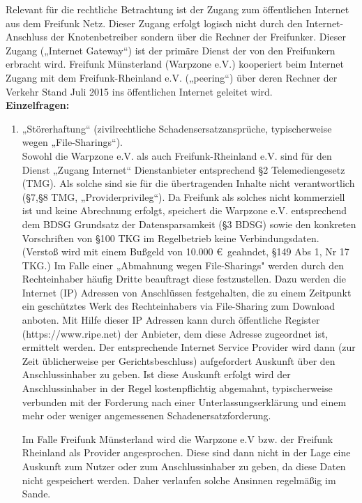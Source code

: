 \documentclass{article}
\begin{document}
Relevant für die rechtliche Betrachtung ist der Zugang zum öffentlichen Internet aus dem Freifunk Netz. Dieser Zugang erfolgt logisch nicht durch den Internet-Anschluss der Knotenbetreiber sondern über die Rechner der Freifunker. Dieser Zugang („Internet Gateway“) ist der primäre Dienst der von den Freifunkern erbracht wird. Freifunk  Münsterland (Warpzone e.V.) kooperiert beim Internet Zugang mit dem Freifunk-Rheinland e.V. („peering“)  über deren Rechner der Verkehr Stand Juli 2015 ins öffentlichen Internet geleitet wird.\bigskip\\

\textbf{Einzelfragen:}

\begin{enumerate}\item  „Störerhaftung“ (zivilrechtliche Schadensersatzansprüche, typischerweise wegen „File-Sharings“).\\
Sowohl die Warpzone e.V. als auch Freifunk-Rheinland e.V. sind für den Dienst „Zugang Internet“ Dienstanbieter entsprechend §2 Telemediengesetz (TMG).  Als solche sind sie für die übertragenden Inhalte nicht verantwortlich (§7,§8 TMG, „Providerprivileg“). Da Freifunk als solches nicht kommerziell ist und keine Abrechnung erfolgt, speichert die Warpzone e.V. entsprechend dem BDSG Grundsatz der Datensparsamkeit (§3 BDSG) sowie den konkreten Vorschriften von §100 TKG im Regelbetrieb keine Verbindungsdaten. (Verstoß wird mit einem Bußgeld von 10.000 \euro\ geahndet, §149 Abs 1, Nr 17 TKG.) Im Falle einer „Abmahnung wegen File-Sharings" werden durch den Rechteinhaber  häufig Dritte beauftragt diese festzustellen. Dazu werden die Internet (IP) Adressen von Anschlüssen festgehalten, die zu einem Zeitpunkt ein geschütztes Werk des Rechteinhabers via File-Sharing zum Download anboten. Mit Hilfe dieser IP Adressen kann durch öffentliche Register (https://www.ripe.net) der Anbieter, dem diese Adresse zugeordnet ist, ermittelt werden. Der entsprechende   Internet Service Provider wird dann (zur Zeit üblicherweise per Gerichtsbeschluss) aufgefordert  Auskunft über den Anschlussinhaber zu geben. Ist diese Auskunft erfolgt wird der Anschlussinhaber in der Regel kostenpflichtig abgemahnt, typischerweise verbunden mit der Forderung nach einer Unterlassungserklärung und einem mehr oder weniger angemessenen Schadenersatzforderung.

Im Falle Freifunk Münsterland wird die Warpzone e.V bzw. der Freifunk Rheinland als Provider angesprochen. Diese sind dann nicht in der Lage eine Auskunft zum Nutzer oder zum Anschlussinhaber zu geben, da diese Daten nicht gespeichert werden. Daher verlaufen solche Ansinnen regelmäßig im Sande.


\end{enumerate}
\end{document}
